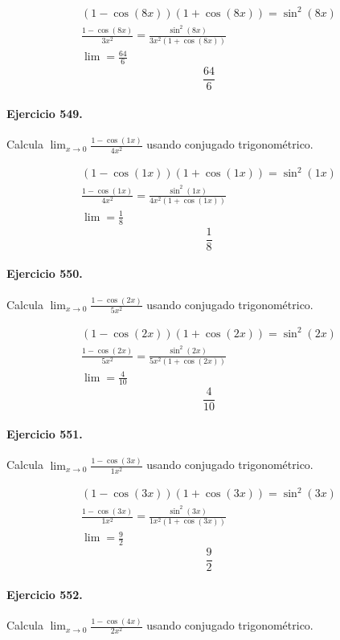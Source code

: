 \documentclass[11pt,a4paper]{article}
\begin{document}
\[
\begin{aligned}
(1-\cos(8x))(1+\cos(8x))=\sin^2(8x)\\
\frac{1-\cos(8x)}{3x^2}=\frac{\sin^2(8x)}{3x^2(1+\cos(8x))}\\
\lim=\frac{64}{6}
\end{aligned}
\]
\[\boxed{\frac{64}{6}}\]


\paragraph{Ejercicio 549.} Calcula $\displaystyle\lim_{x\to0}\frac{1-\cos(1x)}{4x^2}$ usando conjugado trigonométrico.

\[
\begin{aligned}
(1-\cos(1x))(1+\cos(1x))=\sin^2(1x)\\
\frac{1-\cos(1x)}{4x^2}=\frac{\sin^2(1x)}{4x^2(1+\cos(1x))}\\
\lim=\frac{1}{8}
\end{aligned}
\]
\[\boxed{\frac{1}{8}}\]


\paragraph{Ejercicio 550.} Calcula $\displaystyle\lim_{x\to0}\frac{1-\cos(2x)}{5x^2}$ usando conjugado trigonométrico.

\[
\begin{aligned}
(1-\cos(2x))(1+\cos(2x))=\sin^2(2x)\\
\frac{1-\cos(2x)}{5x^2}=\frac{\sin^2(2x)}{5x^2(1+\cos(2x))}\\
\lim=\frac{4}{10}
\end{aligned}
\]
\[\boxed{\frac{4}{10}}\]


\paragraph{Ejercicio 551.} Calcula $\displaystyle\lim_{x\to0}\frac{1-\cos(3x)}{1x^2}$ usando conjugado trigonométrico.

\[
\begin{aligned}
(1-\cos(3x))(1+\cos(3x))=\sin^2(3x)\\
\frac{1-\cos(3x)}{1x^2}=\frac{\sin^2(3x)}{1x^2(1+\cos(3x))}\\
\lim=\frac{9}{2}
\end{aligned}
\]
\[\boxed{\frac{9}{2}}\]


\paragraph{Ejercicio 552.} Calcula $\displaystyle\lim_{x\to0}\frac{1-\cos(4x)}{2x^2}$ usando conjugado trigonométrico.
\end{document}
